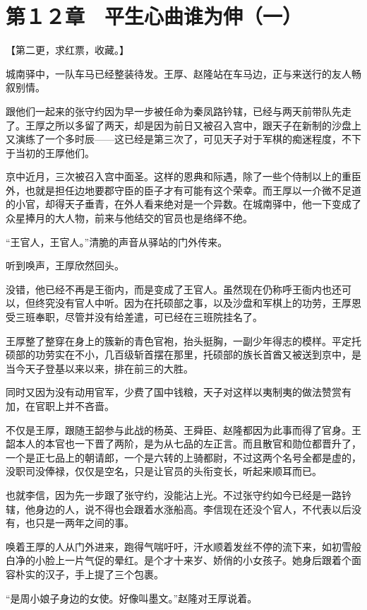 \section{第１２章　平生心曲谁为伸（一）}

【第二更，求红票，收藏。】

城南驿中，一队车马已经整装待发。王厚、赵隆站在车马边，正与来送行的友人畅叙别情。

跟他们一起来的张守约因为早一步被任命为秦凤路钤辖，已经与两天前带队先走了。王厚之所以多留了两天，却是因为前日又被召入宫中，跟天子在新制的沙盘上又演练了一个多时辰——这已经是第三次了，可见天子对于军棋的痴迷程度，不下于当初的王厚他们。

京中近月，三次被召入宫中面圣。这样的恩典和际遇，除了一些个侍制以上的重臣外，也就是担任边地要郡守臣的臣子才有可能有这个荣幸。而王厚以一介微不足道的小官，却得天子垂青，在外人看来绝对是一个异数。在城南驿中，他一下变成了众星捧月的大人物，前来与他结交的官员也是络绎不绝。

“王官人，王官人。”清脆的声音从驿站的门外传来。

听到唤声，王厚欣然回头。

没错，他已经不再是王衙内，而是变成了王官人。虽然现在仍称呼王衙内也还可以，但终究没有官人中听。因为在托硕部之事，以及沙盘和军棋上的功劳，王厚恩受三班奉职，尽管并没有给差遣，可已经在三班院挂名了。

王厚整了整穿在身上的簇新的青色官袍，抬头挺胸，一副少年得志的模样。平定托硕部的功劳实在不小，几百级斩首摆在那里，托硕部的族长首酋又被送到京中，是当今天子登基以来以来，排在前三的大胜。

同时又因为没有动用官军，少费了国中钱粮，天子对这样以夷制夷的做法赞赏有加，在官职上并不吝啬。

不仅是王厚，跟随王韶参与此战的杨英、王舜臣、赵隆都因为此事而得了官身。王韶本人的本官也一下晋了两阶，是为从七品的左正言。而且散官和勋位都晋升了，一个是正七品上的朝请郎，一个是六转的上骑都尉，不过这两个名号全都是虚的，没职司没俸禄，仅仅是空名，只是让官员的头衔变长，听起来顺耳而已。

也就李信，因为先一步跟了张守约，没能沾上光。不过张守约如今已经是一路钤辖，他身边的人，说不得也会跟着水涨船高。李信现在还没个官人，不代表以后没有，也只是一两年之间的事。

唤着王厚的人从门外进来，跑得气喘吁吁，汗水顺着发丝不停的流下来，如初雪般白净的小脸上一片气促的晕红。是个才十来岁、娇俏的小女孩子。她身后跟着个面容朴实的汉子，手上提了三个包裹。

“是周小娘子身边的女使。好像叫墨文。”赵隆对王厚说着。

